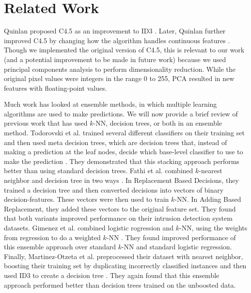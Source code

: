 \section{Related Work}
Quinlan proposed C4.5 as an improvement to ID3 \cite{quinlan2014c4}. Later, Quinlan further improved C4.5 by changing how the algorithm handles continuous features \cite{quinlan1996improved}. Though we implemented the original version of C4.5, this is relevant to our work (and a potential improvement to be made in future work) because we used principal components analysis to perform dimensionality reduction.  While the original pixel values were integers in the range 0 to 255, PCA resulted in new features with floating-point values.

Much work has looked at ensemble methods, in which multiple learning algorithms are used to make predictions. We will now provide a brief review of previous work that has used $k$-NN, decision trees, or both in an ensemble method. Todorovski et al. trained several different classifiers on their training set and then used meta decision trees, which are decision trees that, instead of making a prediction at the leaf nodes, decide which base-level classifier to use to make the prediction \cite{todorovski2003combining}. They demonstrated that this stacking approach performs better than using standard decision trees.
Fathi et al. combined $k$-nearest neighbor and decision tree in two ways \cite{FathiMazinani}. In Replacement Based Decisions, they trained a decision tree and then converted decisions into vectors of binary decision-features. These vectors were then used to train $k$-NN. In Adding Based Replacement, they added these vectors to the original feature set. They found that both variants improved performance on their intrusion detection system datasets.
Gimenez et al. combined logistic rogression and $k$-NN, using the weights from regression to do a weighted $k$-NN \cite{campillo2013improving}. They found improved performance of this ensemble approach over standard $k$-NN and standard logistic regression. Finally, Martinez-Otzeta et al. preprocessed their dataset with nearest neighbor, boosting their training set by duplicating incorrectly classified instances and then used ID3 to create a decision tree \cite{martinezk}. They again found that this ensemble approach performed better than decision trees trained on the unboosted data. 
